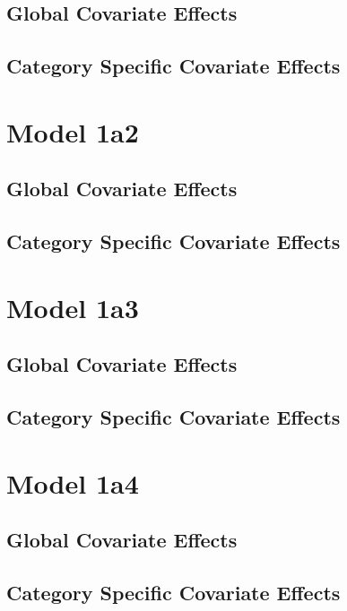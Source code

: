 \documentclass[]{article}
\begin{document}
\subsection{Global Covariate Effects}

\clearpage
\subsection{Category Specific Covariate Effects}

\clearpage

\section{Model 1a2}
\subsection{Global Covariate Effects}

\clearpage
\subsection{Category Specific Covariate Effects}

\clearpage

\section{Model 1a3}
\subsection{Global Covariate Effects}

\clearpage
\subsection{Category Specific Covariate Effects}

\clearpage

\section{Model 1a4}
\subsection{Global Covariate Effects}

\clearpage
\subsection{Category Specific Covariate Effects}

\clearpage
\end{document}
